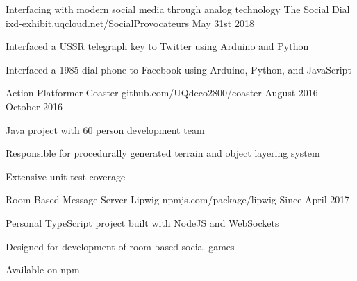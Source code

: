 


\begin{cventries}


\cventry
{Interfacing with modern social media through analog technology} %
{The Social Dial} %
{ixd-exhibit.uqcloud.net/SocialProvocateurs} %
{May 31st 2018} %
{ %
\begin{cvitems}
\item Interfaced a USSR telegraph key to Twitter using Arduino and Python
\item Interfaced a 1985 dial phone to Facebook using Arduino, Python, and JavaScript
\end{cvitems}
}


\cventry
{Action Platformer} %
{Coaster} %
{github.com/UQdeco2800/coaster} %
{August 2016 - October 2016} %
{ %
\begin{cvitems}
\item Java project with 60 person development team
\item Responsible for procedurally generated terrain and object layering system
\item Extensive unit test coverage
\end{cvitems}
}


\cventry
{Room-Based Message Server} %
{Lipwig} %
{npmjs.com/package/lipwig} %
{Since April 2017} %
{ %
\begin{cvitems}
\item Personal TypeScript project built with NodeJS and WebSockets
\item Designed for development of room based social games
\item Available on npm
\end{cvitems}
}


\end{cventries}